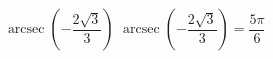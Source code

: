  {$\operatorname{arcsec} \left( -\dfrac{2\sqrt{3}}{3} \right)$}
{ $\operatorname{arcsec} \left( -\dfrac{2\sqrt{3}}{3} \right) = \dfrac{5\pi}{6}$}
